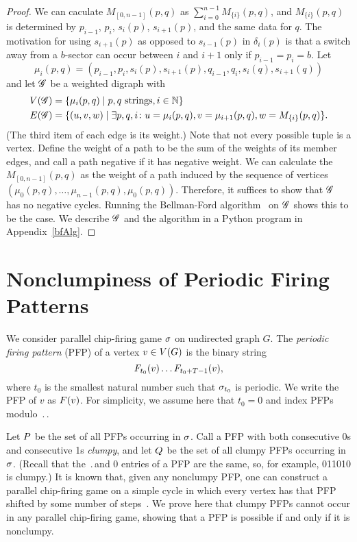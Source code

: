 \begin{proof}
We can caculate $M_{[0,n-1]}(p,q)$ as $\sum_{i=0}^{n-1}M_{\{i\}}(p,q)$, and
$M_{\{i\}}(p,q)$ is determined by $p_{i-1}$, $p_i$, $s_i(p)$, $s_{i+1}(p)$, and
the same data for $q$. The motivation for using $s_{i+1}(p)$ as opposed to
$s_{i-1}(p)$ in $\delta_i(p)$ is that a switch away from a $b$-sector can occur
between $i$ and $i+1$ only if $p_{i-1} = p_i = b$. Let
\[
  \mu_i(p,q) = (p_{i-1},p_i,s_i(p),s_{i+1}(p),q_{i-1},q_i,s_i(q),s_{i+1}(q))
\]
and let $\mathscr{G}$ be a weighted digraph with
\begin{align*}
  \V[\G] &= \set{\mu_i(p,q)}{p,q \text{ strings}, i \in \nats} \\
  \E[\G] &= \set{(u,v,w)}{\exists p,q,i\colon
    u = \mu_i(p,q),
    v = \mu_{i+1}(p,q),
    w = M_{\{i\}}(p,q)}.
\end{align*}
(The third item of each edge is its weight.) Note that not every possible tuple
is a vertex. Define the weight of a path to be the sum of the weights of its
member edges, and call a path negative if it has negative weight. We can
calculate the $M_{[0,n-1]}(p,q)$ as the weight of a path induced by the
sequence of vertices $(\mu_0(p,q), \dots, \mu_{n-1}(p,q),
\mu_0(p,q))$. Therefore, it suffices to show that $\mathscr{G}$ has no negative
cycles. Running the Bellman-Ford algorithm~\cite{bellmanford} on $\mathscr{G}$ shows
this to be the case. We describe $\mathscr{G}$ and the algorithm in a Python program in
Appendix~\ref{bfAlg}.
\end{proof}

\section{Nonclumpiness of Periodic Firing Patterns}\label{nonclumpiness}
We consider parallel chip-firing game $\sigma$ on undirected graph $G$. The
\emph{periodic firing pattern} (PFP) of a vertex $v \in V(G)$ is the binary
string
\[
  \firing{v}{t_0}\dots\firing{v}{t_0 + \period - 1},
\]
where $t_0$ is the smallest natural number such that $\sigma_{t_0}$ is
periodic. We write the PFP of $v$ as $\pfp{v}$. For simplicity, we assume here
that $t_0 = 0$ and index PFPs modulo $\period$.

Let $\pfps$ be the set of all PFPs occurring in $\sigma$. Call a PFP with both
consecutive 0s and consecutive 1s \emph{clumpy}, and let $\cpfps$ be the set of
all clumpy PFPs occurring in $\sigma$. (Recall that the $\period$\xth and 0\xth
entries of a PFP are the same, so, for example, 011010 is clumpy.) It is known
that, given any nonclumpy PFP, one can construct a parallel chip-firing game on
a simple cycle in which every vertex has that PFP shifted by some number of
steps~\cite{cycle}. We prove here that clumpy PFPs cannot occur in any parallel
chip-firing game, showing that a PFP is possible if and only if it is
nonclumpy.

